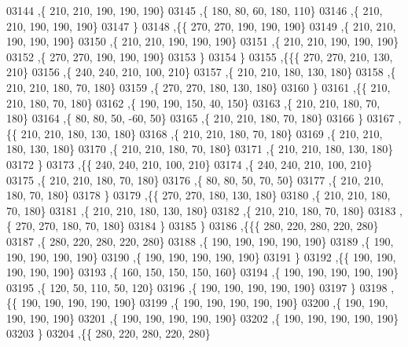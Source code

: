 \begin{DoxyCode}
03144     ,\{   210,   210,   190,   190,   190\}
03145     ,\{   180,    80,    60,   180,   110\}
03146     ,\{   210,   210,   190,   190,   190\}
03147     \}
03148    ,\{\{   270,   270,   190,   190,   190\}
03149     ,\{   210,   210,   190,   190,   190\}
03150     ,\{   210,   210,   190,   190,   190\}
03151     ,\{   210,   210,   190,   190,   190\}
03152     ,\{   270,   270,   190,   190,   190\}
03153     \}
03154    \}
03155   ,\{\{\{   270,   270,   210,   130,   210\}
03156     ,\{   240,   240,   210,   100,   210\}
03157     ,\{   210,   210,   180,   130,   180\}
03158     ,\{   210,   210,   180,    70,   180\}
03159     ,\{   270,   270,   180,   130,   180\}
03160     \}
03161    ,\{\{   210,   210,   180,    70,   180\}
03162     ,\{   190,   190,   150,    40,   150\}
03163     ,\{   210,   210,   180,    70,   180\}
03164     ,\{    80,    80,    50,   -60,    50\}
03165     ,\{   210,   210,   180,    70,   180\}
03166     \}
03167    ,\{\{   210,   210,   180,   130,   180\}
03168     ,\{   210,   210,   180,    70,   180\}
03169     ,\{   210,   210,   180,   130,   180\}
03170     ,\{   210,   210,   180,    70,   180\}
03171     ,\{   210,   210,   180,   130,   180\}
03172     \}
03173    ,\{\{   240,   240,   210,   100,   210\}
03174     ,\{   240,   240,   210,   100,   210\}
03175     ,\{   210,   210,   180,    70,   180\}
03176     ,\{    80,    80,    50,    70,    50\}
03177     ,\{   210,   210,   180,    70,   180\}
03178     \}
03179    ,\{\{   270,   270,   180,   130,   180\}
03180     ,\{   210,   210,   180,    70,   180\}
03181     ,\{   210,   210,   180,   130,   180\}
03182     ,\{   210,   210,   180,    70,   180\}
03183     ,\{   270,   270,   180,    70,   180\}
03184     \}
03185    \}
03186   ,\{\{\{   280,   220,   280,   220,   280\}
03187     ,\{   280,   220,   280,   220,   280\}
03188     ,\{   190,   190,   190,   190,   190\}
03189     ,\{   190,   190,   190,   190,   190\}
03190     ,\{   190,   190,   190,   190,   190\}
03191     \}
03192    ,\{\{   190,   190,   190,   190,   190\}
03193     ,\{   160,   150,   150,   150,   160\}
03194     ,\{   190,   190,   190,   190,   190\}
03195     ,\{   120,    50,   110,    50,   120\}
03196     ,\{   190,   190,   190,   190,   190\}
03197     \}
03198    ,\{\{   190,   190,   190,   190,   190\}
03199     ,\{   190,   190,   190,   190,   190\}
03200     ,\{   190,   190,   190,   190,   190\}
03201     ,\{   190,   190,   190,   190,   190\}
03202     ,\{   190,   190,   190,   190,   190\}
03203     \}
03204    ,\{\{   280,   220,   280,   220,   280\}

\end{DoxyCode}
